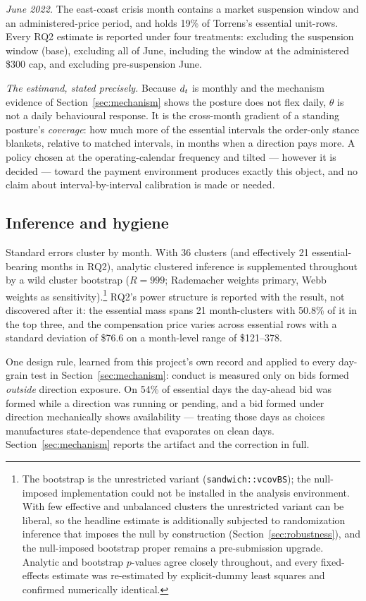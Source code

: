 \emph{June 2022.} The east-coast crisis month contains a market suspension
window and an administered-price period, and holds 19\% of Torrens's essential
unit-rows. Every RQ2 estimate is reported under four treatments: excluding the
suspension window (base), excluding all of June, including the window at the
administered \$300 cap, and excluding pre-suspension June.

\emph{The estimand, stated precisely.} Because $d_t$ is monthly and the
mechanism evidence of Section~\ref{sec:mechanism} shows the posture does not
flex daily, $\theta$ is not a daily behavioural response. It is the
cross-month gradient of a standing posture's \emph{coverage}: how much more
of the essential intervals the order-only stance blankets, relative to
matched intervals, in months when a direction pays more. A policy chosen at
the operating-calendar frequency and tilted --- however it is decided ---
toward the payment environment produces exactly this object, and no claim
about interval-by-interval calibration is made or needed.

\subsection{Inference and hygiene}

Standard errors cluster by month. With 36 clusters (and effectively 21
essential-bearing months in RQ2), analytic clustered inference is supplemented
throughout by a wild cluster bootstrap ($R=999$; Rademacher weights primary,
Webb weights as sensitivity).\footnote{The bootstrap is the unrestricted
variant (\texttt{sandwich::vcovBS}); the null-imposed implementation could not
be installed in the analysis environment. With few effective and unbalanced
clusters the unrestricted variant can be liberal, so the headline estimate
is additionally subjected to randomization inference that imposes the null
by construction (Section~\ref{sec:robustness}), and the null-imposed
bootstrap proper remains a pre-submission upgrade. Analytic and bootstrap
$p$-values agree closely throughout, and every fixed-effects estimate was
re-estimated by explicit-dummy least squares and confirmed numerically
identical.} RQ2's power structure is reported with the
result, not discovered after it: the essential mass spans 21 month-clusters
with 50.8\% of it in the top three, and the compensation price varies across
essential rows with a standard deviation of \$76.6 on a month-level range of
\$121--378.

One design rule, learned from this project's own record and applied to every
day-grain test in Section~\ref{sec:mechanism}: conduct is measured only on
bids formed \emph{outside} direction exposure. On 54\% of essential days the
day-ahead bid was formed while a direction was running or pending, and a bid
formed under direction mechanically shows availability --- treating those days
as choices manufactures state-dependence that evaporates on clean days.
Section~\ref{sec:mechanism} reports the artifact and the correction in full.
